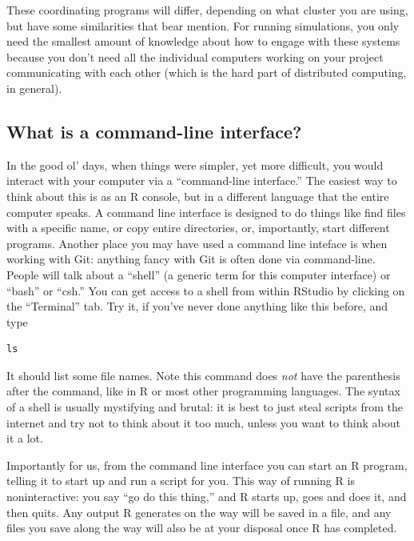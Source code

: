 \documentclass[
]{book}
\begin{document}
These coordinating programs will differ, depending on what cluster you are using, but have some similarities that bear mention.
For running simulations, you only need the smallest amount of knowledge about how to engage with these systems because you don't need all the individual computers working on your project communicating with each other (which is the hard part of distributed computing, in general).

\hypertarget{what-is-a-command-line-interface}{%
\subsection{What is a command-line interface?}\label{what-is-a-command-line-interface}}

In the good ol' days, when things were simpler, yet more difficult, you would interact with your computer via a ``command-line interface.''
The easiest way to think about this is as an R console, but in a different language that the entire computer speaks.
A command line interface is designed to do things like find files with a specific name, or copy entire directories, or, importantly, start different programs.
Another place you may have used a command line inteface is when working with Git: anything fancy with Git is often done via command-line.
People will talk about a ``shell'' (a generic term for this computer interface) or ``bash'' or ``csh.''
You can get access to a shell from within RStudio by clicking on the ``Terminal'' tab.
Try it, if you've never done anything like this before, and type

\begin{verbatim}
ls
\end{verbatim}

It should list some file names.
Note this command does \emph{not} have the parenthesis after the command, like in R or most other programming languages.
The syntax of a shell is usually mystifying and brutal: it is best to just steal scripts from the internet and try not to think about it too much, unless you want to think about it a lot.

Importantly for us, from the command line interface you can start an R program, telling it to start up and run a script for you.
This way of running R is noninteractive: you say ``go do this thing,'' and R starts up, goes and does it, and then quits.
Any output R generates on the way will be saved in a file, and any files you save along the way will also be at your disposal once R has completed.
\end{document}
